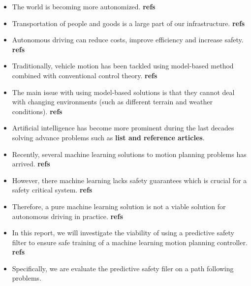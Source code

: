 \documentclass[english]{kththesis}
\begin{document}
\begin{itemize}
    \item The world is becoming more autonomized. \textbf{refs}
    \item Transportation of people and goods is a large part of our
        infrastructure. \textbf{refs}
    \item Autonomous driving can reduce costs, improve efficiency and increase
        safety. \textbf{refs}
    \item Traditionally, vehicle motion has been tackled using model-based
        method combined with conventional control theory. \textbf{refs}
    \item The main issue with using model-based solutions is that they cannot
          deal with changing environments (such as different terrain and
          weather conditions). \textbf{refs}
    \item Artificial intelligence has become more prominent during the
          last decades solving advance problems such as \textbf{list and reference
          articles}.
      \item Recently, several machine learning solutions to motion planning
          problems has arrived. \textbf{refs}
    \item However, there machine learning lacks safety guarantees which is
        crucial for a safety critical system. \textbf{refs}
    \item Therefore, a pure machine learning solution is not a viable solution
        for autonomous driving in practice. \textbf{refs}
    \item In this report, we will investigate the viability of using a predictive
        safety filter to ensure safe training of a machine learning motion
        planning controller. \textbf{refs}
    \item Specifically, we are evaluate the predictive safety filer on a path following problems.
\end{itemize}

\label{ch:introduction}
\end{document}
